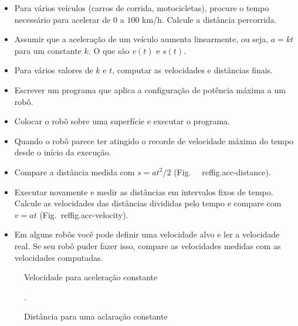 {\begin{framed}

\begin{itemize}
\item Para vários veículos (carros de corrida, motocicletas), procure o tempo necessário para acelerar de $0$ a $100$ km/h. Calcule a distância percorrida.
\item Assumir que a aceleração de um veículo aumenta linearmente, ou seja, $a=kt$ para um constante $k$. O que são $v(t)$ e $s(t)$.
\item Para vários valores de $k$ e $t$, computar as velocidades e distâncias finais.
\end{itemize}
\end{framed}

\begin{framed}
\begin{itemize}
\item Escrever um programa que aplica a configuração de potência máxima a um robô.
\item Colocar o robô sobre uma superfície e executar o programa.
\item Quando o robô parece ter atingido o recorde de velocidade máxima do tempo desde o início da execução.
\item Compare a distância medida com $s = at^2/2$ (Fig.~ ~ref{fig.acc-distance}).
\item Executar novamente e medir as distâncias em intervalos fixos de tempo. Calcule as velocidades das distâncias divididas pelo tempo e compare com $v=at$ (Fig.~ref{fig.acc-velocity}).
\item Em alguns robôs você pode definir uma velocidade alvo e ler a velocidade real. Se seu robô puder fazer isso, compare as velocidades medidas com as velocidades computadas.
\end{itemize}
\end{framed}
\begin{figure}
\begin{minipage}{.45\textwidth}
\caption{Velocidade para aceleração constante}\label{fig.acc-velocity}
\end{minipage}
\hspace{\fill}
\begin{minipage}{.45\textwidth}
\caption{Distância para uma aclaração constante}\label{fig.acc-distance}.
\end{minipage}
\end{figure}

}
